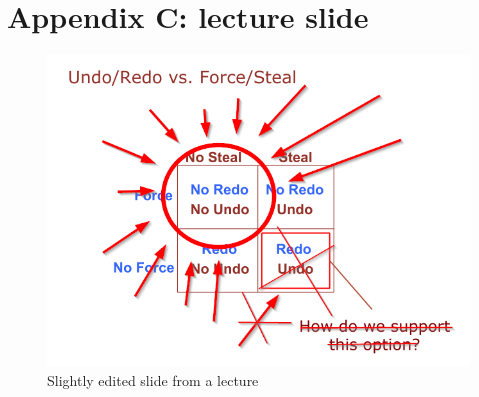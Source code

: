 \documentclass[11pt,a4paper]{article}
\begin{document}
\section{Appendix C: lecture slide}
\begin{figure}[h!]
    \centering
    \includegraphics[scale=0.7]{images/force-nosteal.png}
\caption{Slightly edited slide from a lecture}
\label{slide}
\end{figure}
\end{document}
